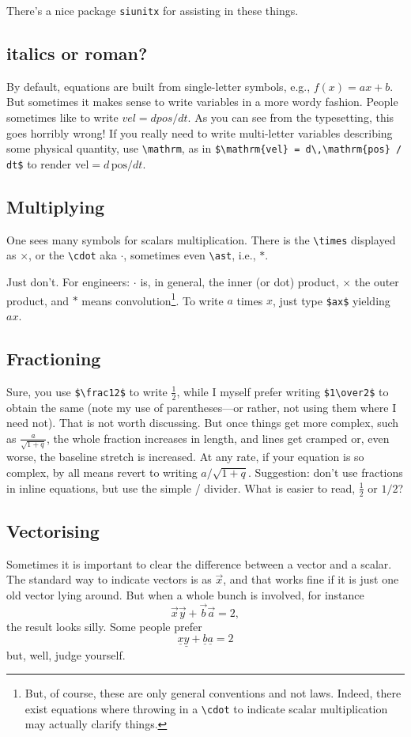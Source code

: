 \documentclass{article}
\begin{document}
There's a nice package \texttt{siunitx} for assisting in these things. 

\subsection{italics or roman?}
By default, equations are built from single-letter symbols, e.g., $f(x) = ax+b$.  But sometimes it makes sense to write variables in a more wordy fashion.  People sometimes like to write $vel = d pos / d t$.  As you can see from the typesetting, this goes horribly wrong!  If you really need to write multi-letter variables describing some physical quantity, use \verb+\mathrm+, as in \verb+$\mathrm{vel} = d\,\mathrm{pos} / dt$+ to render $\mathrm{vel} = d\, \mathrm{pos} / dt$.

\subsection{Multiplying}
One sees many symbols for scalars multiplication.  There is the \verb+\times+ displayed as $\times$, or the \verb+\cdot+ aka $\cdot$, sometimes even \verb+\ast+, i.e., $\ast$.

Just don't.  For engineers: $\cdot$ is, in general, the inner (or dot) product, $\times$ the  outer product, and $\ast$ means convolution\footnote{But, of course, these are only general conventions and not laws.  Indeed, there exist equations where throwing in a \verb+\cdot+ to indicate scalar multiplication may actually clarify things.}. To write $a$ times $x$, just type \verb+$ax$+ yielding $ax$.


\subsection{Fractioning}
Sure, you use \verb+$\frac12$+ to write $\frac12$, while I myself prefer writing \verb+$1\over2$+ to obtain the same (note my use of parentheses---or rather, not using them where I need not). That is not worth discussing.  But once things get more complex, such as $\frac a{\sqrt{1+q}}$, the whole fraction increases in length, and lines get cramped or, even worse, the baseline stretch is increased. At any rate, if your equation is so complex, by all means revert to writing $a/{\sqrt{1+q}}$.   Suggestion: don't use fractions in inline equations, but use the simple / divider.  What is easier to read, $\frac12$ or $1/2$?

\subsection{Vectorising}
Sometimes it is important to clear the difference between a vector and a scalar. The standard way to indicate vectors is as $\vec x$, and that works fine if it is  just one old vector lying around.  But when a whole bunch is involved, for instance $$ \vec x \vec y + \vec b \vec a = 2,$$ the result looks silly.  Some people prefer $$ \underline x \underline y + \underline b \underline a = 2$$ but, well, judge yourself.  
\end{document}
